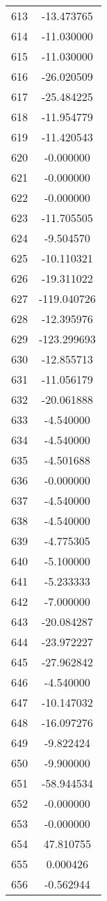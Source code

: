 \documentclass[12pt]{article}
\begin{document}
\begin{longtable}{@{}cc@{}}
613 & -13.473765 \\
614 & -11.030000 \\
615 & -11.030000 \\
616 & -26.020509 \\
617 & -25.484225 \\
618 & -11.954779 \\
619 & -11.420543 \\
620 & -0.000000 \\
621 & -0.000000 \\
622 & -0.000000 \\
623 & -11.705505 \\
624 & -9.504570 \\
625 & -10.110321 \\
626 & -19.311022 \\
627 & -119.040726 \\
628 & -12.395976 \\
629 & -123.299693 \\
630 & -12.855713 \\
631 & -11.056179 \\
632 & -20.061888 \\
633 & -4.540000 \\
634 & -4.540000 \\
635 & -4.501688 \\
636 & -0.000000 \\
637 & -4.540000 \\
638 & -4.540000 \\
639 & -4.775305 \\
640 & -5.100000 \\
641 & -5.233333 \\
642 & -7.000000 \\
643 & -20.084287 \\
644 & -23.972227 \\
645 & -27.962842 \\
646 & -4.540000 \\
647 & -10.147032 \\
648 & -16.097276 \\
649 & -9.822424 \\
650 & -9.900000 \\
651 & -58.944534 \\
652 & -0.000000 \\
653 & -0.000000 \\
654 & 47.810755 \\
655 & 0.000426 \\
656 & -0.562944 \\

\end{longtable}
\end{document}
